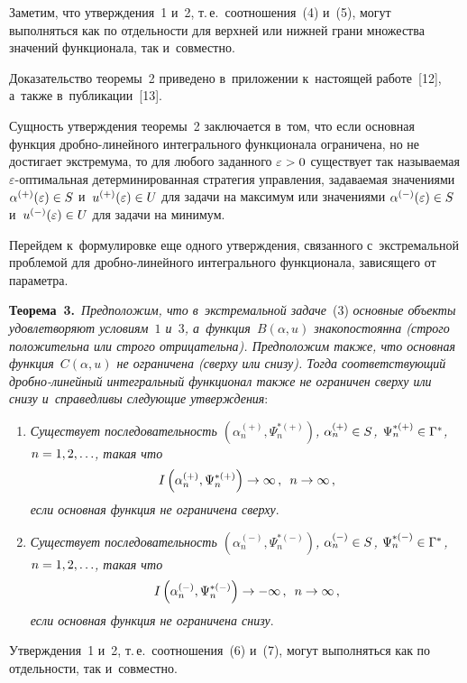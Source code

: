 \begin{multicols}{2}
     Заметим, что утверж\-де\-ния~1 и~2, т.\,е.\ соотношения~(4) и~(5), могут 
выполняться как по отдельности для верхней или нижней грани множества 
значений функционала, так и~со\-вместно.
     
     \smallskip
     
     Доказательство теоремы~2 приведено в~приложении к~на\-сто\-ящей 
работе~[12], а~так\-же в~пуб\-ли\-ка\-ции~[13].
     
     \smallskip
     
     Сущность утверж\-де\-ния тео\-ре\-мы~2 заключается в~том, что если основная 
функция  
дроб\-но-ли\-ней\-но\-го интегрального функционала ограничена, но не 
достигает экстремума, то для любого заданного $\varepsilon\hm>0$ существует 
так называемая $\varepsilon$-оп\-ти\-маль\-ная детерминированная стратегия 
управления, за\-да\-ва\-емая значениями $\alpha^{(+)} (\varepsilon)\hm\in S$ 
и~$u^{(+)}(\varepsilon)\hm\in U$ для задачи на максимум или значениями 
$\alpha^{(-)} (\varepsilon)\hm\in S$  
и~$u^{(-)}(\varepsilon)\hm\in U$ для задачи на минимум.
     
     Перейдем к~формулировке еще одного утверж\-де\-ния, связанного 
с~экстремальной проблемой для  
дроб\-но-ли\-ней\-но\-го интегрального функционала, зависящего от па\-ра\-метра.
     
     \smallskip
     
     \noindent
     \textbf{Теорема~3.}\ \textit{Предположим, что в~экстремальной 
задаче}~(3) \textit{основные объекты удовлетворяют условиям~$1$ и~$3$, 
а~функция~$B(\alpha,u)$ знакопостоянна (строго положительна или строго 
отрицательна). Предположим также, что основная функция~$C(\alpha, u)$ не 
ограничена (сверху или снизу). Тогда соответствующий дроб\-но-ли\-ней\-ный 
интегральный функционал также не ограничен сверху или снизу 
и~справедливы сле\-ду\-ющие утверж\-де\-ния}:
     \begin{enumerate}[1.]
     \item
\textit{Существует последовательность $(\alpha_n^{(+)}, 
\Psi_n^{*(+)})$, $\alpha_n^{(+)}\hm\in S$, $\Psi_n^{*(+)}\hm\in 
\Gamma^*$, $n\hm=1,2,\ldots$, такая что}
 \begin{equation}
I\left( \alpha_n^{(+)}, \Psi_n^{*(+)} \right)\to \infty\,,\enskip n\to \infty\,,
\label{e6-shn}
\end{equation}
\textit{если основная функция не ограничена сверху}.
\item 
\textit{Существует последовательность $(\alpha_n^{(-)}, \Psi_n^{*(-)})$, 
$\alpha_n^{(-)}\hm\in S$, $\Psi_n^{*(-)}\hm\in \Gamma^*$, 
$n\hm=1,2,\ldots$, такая что} 
\begin{equation}
I\left( \alpha_n^{(-)}, \Psi_n^{*(-)} \right)\to -\infty\,,\enskip n\to \infty\,,
\label{e7-shn}
\end{equation}
\textit{если основная функция не ограничена снизу}.
\end{enumerate}
     Утверждения~1 и~2, т.\,е.\ соотношения~(6) и~(7), могут выполняться 
как по от\-дель\-ности, так и~со\-вместно.
     

\end{multicols}
